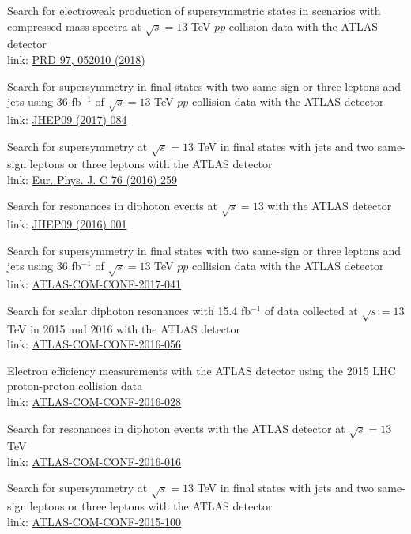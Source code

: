 \documentclass[letterpaper]{deedy-resume-openfont}
\begin{document}
\location{}
\begin{tightemize}
\item Search for electroweak production of supersymmetric states in scenarios with compressed mass spectra at $\sqrt{s} = 13$ TeV $pp$ collision data with the ATLAS detector\\
      link: \href{https://journals.aps.org/prd/abstract/10.1103/PhysRevD.97.052010}{PRD 97, 052010 (2018)}
\item Search for supersymmetry in final states with two same-sign or three leptons and jets using 36 fb$^{-1}$ of $\sqrt{s} = 13$ TeV $pp$ collision data with the ATLAS detector\\
      link: \href{https://link.springer.com/article/10.1007/JHEP09(2017)084}{JHEP09 (2017) 084}
\item Search for supersymmetry at $\sqrt{s} = 13$ TeV in final states with jets and two same-sign leptons or three leptons with the ATLAS detector\\
      link: \href{https://link.springer.com/article/10.1140%2Fepjc%2Fs10052-016-4095-8}{Eur. Phys. J. C 76 (2016) 259}
\item Search for resonances in diphoton events at $\sqrt{s} = 13$ with the ATLAS detector\\
      link: \href{https://link.springer.com/article/10.1007/JHEP09(2016)001}{JHEP09 (2016) 001}
\end{tightemize}
\sectionsep

\location{}
\begin{tightemize}
\item Search for supersymmetry in final states with two same-sign or three leptons and jets using 36 fb$^{-1}$ of $\sqrt{s} = 13$ TeV $pp$ collision data with the ATLAS detector\\
      link: \href{https://cds.cern.ch/record/2261952}{ATLAS-COM-CONF-2017-041}
\item Search for scalar diphoton resonances with 15.4 fb$^{-1}$ of data collected at $\sqrt{s} = 13$ TeV in 2015 and 2016 with the ATLAS detector\\
      link: \href{https://cds.cern.ch/record/2199338}{ATLAS-COM-CONF-2016-056}
\item Electron efficiency measurements with the ATLAS detector using the 2015 LHC proton-proton collision data\\
      link: \href{https://cds.cern.ch/record/2142831}{ATLAS-COM-CONF-2016-028}
\item Search for resonances in diphoton events with the ATLAS detector at $\sqrt{s} = 13$ TeV\\
      link: \href{https://cds.cern.ch/record/2138074}{ATLAS-COM-CONF-2016-016}
\item Search for supersymmetry at $\sqrt{s} = 13$ TeV in final states with jets and two same-sign leptons or three leptons with the ATLAS detector\\
      link: \href{https://cds.cern.ch/record/2114088}{ATLAS-COM-CONF-2015-100}
\end{tightemize}
\sectionsep
\end{document}
